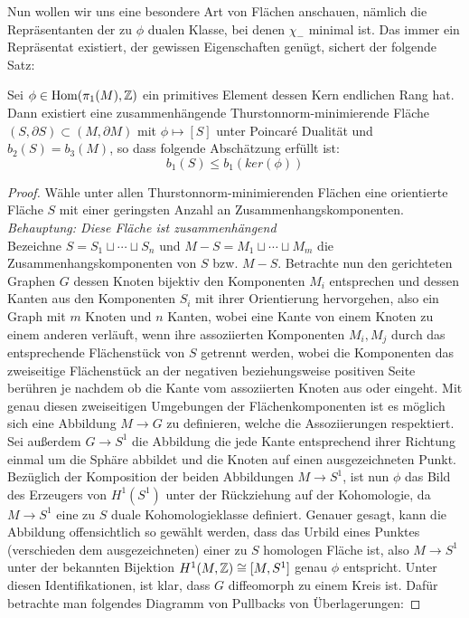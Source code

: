 Nun wollen wir uns eine besondere Art von Flächen anschauen, nämlich die Repräsentanten der zu $\phi$ dualen Klasse, bei denen $\chi_-$ minimal ist. Das immer ein Repräsentat existiert, der gewissen Eigenschaften genügt, sichert der folgende Satz:

\begin{lem}
	\label{lem:minS}
	Sei $\phi \in \operatorname{Hom} (\pi_1(M),\mathbb{Z})$ ein primitives Element dessen Kern endlichen Rang hat. Dann existiert eine zusammenhängende Thurstonnorm-minimierende Fläche $(S,\partial S) \subset (M,\partial M)$ mit $\phi \mapsto [S]$ unter Poincaré Dualität und $b_2(S)=b_3(M)$, so dass folgende Abschätzung erfüllt ist:
	\[
	b_1(S) \leq b_1(ker(\phi))
	\]
\end{lem}
\begin{proof}
	Wähle unter allen Thurstonnorm-minimierenden Flächen eine orientierte Fläche $S$ mit einer geringsten Anzahl an Zusammenhangskomponenten.\\
	\textit{Behauptung: Diese Fläche ist zusammenhängend}\\
	Bezeichne $S=S_1\sqcup \cdots \sqcup S_n$ und $M-S = M_1 \sqcup \cdots \sqcup M_m$ die Zusammenhangskomponenten von $S$ bzw. $M-S$. Betrachte nun den gerichteten Graphen $G$ dessen Knoten bijektiv den Komponenten $M_i$ entsprechen und dessen Kanten aus den Komponenten $S_i$ mit ihrer Orientierung hervorgehen, also ein Graph mit $m$ Knoten und $n$ Kanten, wobei eine Kante von einem Knoten zu einem anderen verläuft, wenn ihre assoziierten Komponenten $M_i, M_j$ durch das entsprechende Flächenstück von $S$ getrennt werden, wobei die Komponenten das zweiseitige Flächenstück an der negativen beziehungsweise positiven Seite berühren je nachdem ob die Kante vom assoziierten Knoten aus oder eingeht. Mit genau diesen zweiseitigen Umgebungen der Flächenkomponenten ist es möglich sich eine Abbildung $M \to G$ zu definieren, welche die Assoziierungen respektiert. Sei außerdem $G \to S^1$ die Abbildung die jede Kante entsprechend ihrer Richtung einmal um die Sphäre abbildet und die Knoten auf einen ausgezeichneten Punkt. Bezüglich der Komposition der beiden Abbildungen $M \to S^1$, ist nun $\phi$ das Bild des Erzeugers von $H^1(S^1)$ unter der Rückziehung auf der Kohomologie, da $M \to S^1$ eine zu $S$ duale Kohomologieklasse definiert. Genauer gesagt, kann die Abbildung offensichtlich so gewählt werden, dass das Urbild eines Punktes (verschieden dem ausgezeichneten) einer zu $S$ homologen Fläche ist, also $M \to S^1$ unter der bekannten Bijektion $H^1(M,\mathbb{Z}) \cong [M,S^1]$ genau $\phi$ entspricht. Unter diesen Identifikationen, ist klar, dass $G$ diffeomorph zu einem Kreis ist. Dafür betrachte man folgendes Diagramm von Pullbacks von Überlagerungen:


\end{proof}
